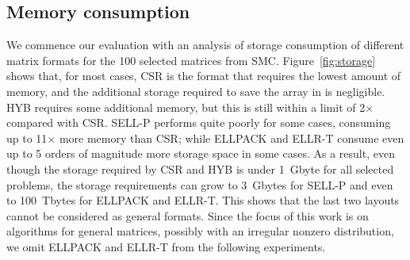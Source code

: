 \subsection{Memory consumption}

We commence our evaluation with an analysis of storage consumption
of different matrix formats for the 100 selected matrices from SMC.
Figure~\ref{fig:storage} shows that,
for most cases, CSR is the format that requires the lowest amount of memory,
and the additional storage required to save the \srow array in \bcsr
is negligible.
HYB requires some additional memory,
but this is still within a limit
of 2$\times$ compared with CSR.
SELL-P performs quite poorly for some cases,
consuming up to 11$\times$ more memory than CSR;
while ELLPACK and ELLR-T consume even up to 5 orders of magnitude more
storage space in some cases.
As a result, even though the storage required by CSR and HYB is under 1~Gbyte
for all selected problems, the storage requirements can grow to 3~Gbytes for SELL-P
and even to 100~Tbytes for ELLPACK and ELLR-T.
This shows that the last two layouts cannot be considered as general formats.
Since the focus of this work is on \spmv algorithms
for general matrices,
possibly with an irregular nonzero distribution,
we omit ELLPACK and ELLR-T from the following experiments.

